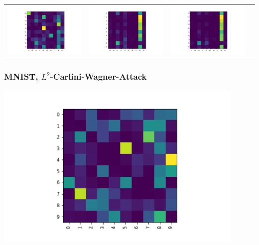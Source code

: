 \documentclass[10pt,usepdftitle=false,aspectratio=169]{beamer}
\begin{document}
\begin{frame}
\begin{tabular}{cccc}
		\includegraphics[align=c,width=0.3\columnwidth]{../code/results/MNIST/figures/LinfPGD, epsilon=0.2.png} &
		\includegraphics[align=c,width=0.3\columnwidth]{../code/results/MNIST/figures/LinfPGD, epsilon=0.5.png} &
		\includegraphics[align=c,width=0.3\columnwidth]{../code/results/MNIST/figures/LinfPGD, epsilon=1.png} &
	\end{tabular}
\end{frame}

\begin{frame}
	\frametitle{MNIST, $L^2$-Carlini-Wagner-Attack}
	
	\includegraphics[align=c,width=0.9\textwidth]{../code/results/MNIST/figures/L2CarliniWagnerAttack.png}
\end{frame}
\end{document}
